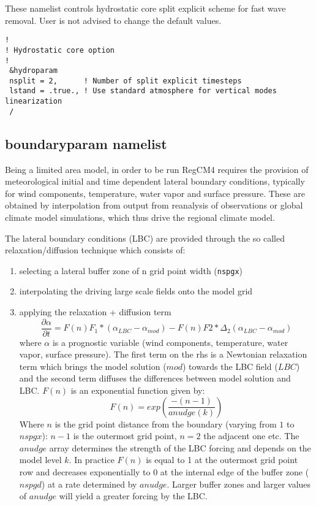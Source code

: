 These namelist controls hydrostatic core split explicit scheme for
fast wave removal. User is not advised to change the default values.

{\footnotesize
\begin{Verbatim}
!
! Hydrostatic core option
!
 &hydroparam
 nsplit = 2,      ! Number of split explicit timesteps
 lstand = .true., ! Use standard atmosphere for vertical modes linearization
 /
\end{Verbatim}
}

\subsection{boundaryparam namelist}

Being a limited area model, in order to be run RegCM4 requires the provision
of meteorological initial and time dependent lateral boundary conditions,
typically for wind components, temperature, water vapor and surface pressure.
These are obtained by interpolation from output from reanalysis of observations
or global climate model simulations, which thus drive the regional climate
model.

The lateral boundary conditions (LBC) are provided through the so called
relaxation/diffusion technique which consists of:

\begin{enumerate}
\item selecting a lateral buffer zone of n grid point width (\verb=nspgx=)
\item interpolating the driving large scale fields onto the model grid
\item applying the relaxation + diffusion term
\begin{equation}
\frac{\partial \alpha}{\partial t} = F(n)F_1 * (\alpha_{LBC}-\alpha_{mod}) -
    F(n)F2 * \Delta_2(\alpha_{LBC}-\alpha_{mod})
\end{equation}
where $\alpha$ is a prognostic variable (wind components, temperature, water
vapor, surface pressure). The first term on the rhs is a Newtonian relaxation
term which brings the model solution ($mod$) towards the LBC field ($LBC$)
and the second term diffuses the differences between model solution and LBC.
$F(n)$ is an exponential function given by:
\begin{equation}
F(n) = exp\left(\frac{-(n-1)}{anudge(k)}\right)
\end{equation}
Where $n$ is the grid point distance from the boundary (varying from $1$ to
$nspgx$): $n-1$ is the outermost grid point, $n=2$ the adjacent one etc.
The $anudge$ array determines the strength of the LBC forcing and depends on
the model level $k$. In practice $F(n)$ is equal to 1 at the outermost grid
point row and decreases exponentially to $0$ at the internal edge of the buffer
zone ($nspgd$) at a rate determined by $anudge$. Larger buffer zones and larger
values of $anudge$ will yield a greater forcing by the LBC.  
\end{enumerate}

